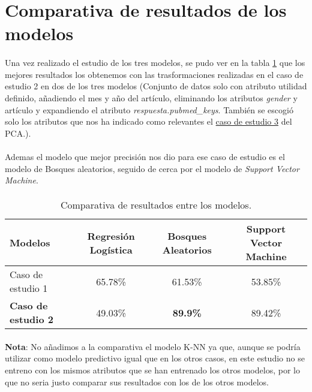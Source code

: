 \section{Comparativa de resultados de los modelos}
\label{resultados:compare}

\paragraph{}
Una vez realizado el estudio de los tres modelos, se pudo ver en la tabla \ref{table:comparative} que los mejores resultados los obtenemos con las trasformaciones realizadas en el caso de estudio 2 en dos de los tres modelos (Conjunto de datos solo con atributo utilidad definido, añadiendo el mes y año del artículo, eliminando los atributos \textit{gender} y artículo y expandiendo el atributo \textit{respuesta.pubmed\_keys}. También se escogió solo los atributos que nos ha indicado como relevantes el \hyperref[result:pca_case3]{caso de estudio 3} del PCA.).

\paragraph{}
Ademas el modelo que mejor precisión nos dio para ese caso de estudio es el modelo de Bosques aleatorios, seguido de cerca por el modelo de \textit{Support Vector Machine}.

\paragraph{}
\begin{table}[!htb]
	\begin{tabular}{ | p{4cm} | c | c | c | }
		\hline Modelos & Regresión Logística & \textbf{Bosques Aleatorios} & Support Vector Machine \\ 
		\hline
		\hline
		Caso de estudio 1 & 65.78\% & 61.53\% & 53.85\% \\
		\textbf{Caso de estudio 2} & 49.03\% & \textbf{89.9\%} & 89.42\% \\ \hline
	\end{tabular}
		\caption{Comparativa de resultados entre los modelos.} \label{table:comparative}
\end{table}

\paragraph{}
\textbf{Nota}: No añadimos a la comparativa el modelo K-NN ya que, aunque se podría utilizar como modelo predictivo igual que en los otros casos, en este estudio no se entreno con los mismos atributos que se han entrenado los otros modelos, por lo que no seria justo comparar sus resultados con los de los otros modelos.